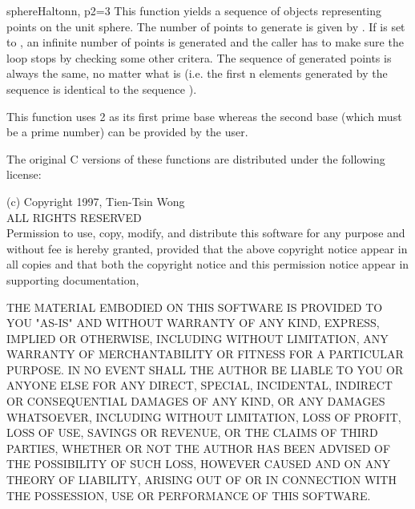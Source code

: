 \begin{funcdesc}{sphereHalton}{n, p2=3}
This function yields a sequence of  objects representing
points on the unit sphere. The number of points to generate is given
by . If  is set to , an infinite number of
points is generated and the caller has to make sure the loop stops by
checking some other critera. The sequence of generated points is
always the same, no matter what  is (i.e. the first n elements
generated by the sequence  is identical to the
sequence ).

This function uses 2 as its first prime base whereas the second base
 (which must be a prime number) can be provided by the user.
\end{funcdesc}

\begin{notice}[note]
The original C versions of these functions are distributed under the
following license:
  
(c) Copyright 1997, Tien-Tsin Wong\\
ALL RIGHTS RESERVED\\
Permission to use, copy, modify, and distribute this software for
any purpose and without fee is hereby granted, provided that the above
copyright notice appear in all copies and that both the copyright notice
and this permission notice appear in supporting documentation,
 
THE MATERIAL EMBODIED ON THIS SOFTWARE IS PROVIDED TO YOU "AS-IS"
AND WITHOUT WARRANTY OF ANY KIND, EXPRESS, IMPLIED OR OTHERWISE,
INCLUDING WITHOUT LIMITATION, ANY WARRANTY OF MERCHANTABILITY OR
FITNESS FOR A PARTICULAR PURPOSE.  IN NO EVENT SHALL THE AUTHOR
BE LIABLE TO YOU OR ANYONE ELSE FOR ANY DIRECT,
SPECIAL, INCIDENTAL, INDIRECT OR CONSEQUENTIAL DAMAGES OF ANY
KIND, OR ANY DAMAGES WHATSOEVER, INCLUDING WITHOUT LIMITATION,
LOSS OF PROFIT, LOSS OF USE, SAVINGS OR REVENUE, OR THE CLAIMS OF
THIRD PARTIES, WHETHER OR NOT THE AUTHOR HAS BEEN
ADVISED OF THE POSSIBILITY OF SUCH LOSS, HOWEVER CAUSED AND ON
ANY THEORY OF LIABILITY, ARISING OUT OF OR IN CONNECTION WITH THE
POSSESSION, USE OR PERFORMANCE OF THIS SOFTWARE.
\end{notice}

